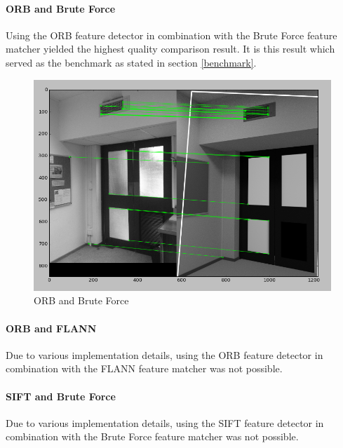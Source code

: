 \documentclass[11pt,a4paper]{report}
\begin{document}
				\paragraph{ORB and Brute Force}
					Using the ORB feature detector in combination with the Brute Force feature matcher yielded the highest quality comparison result. It is this result which served as the benchmark as stated in section \ref{benchmark}.
					\begin{figure}[H]
						\centering
						\includegraphics[width=1\textwidth]{best_comparason}
						\caption{ORB and Brute Force}
						\label{fig:orb_and_brute_force}
					\end{figure}
					
				\paragraph{ORB and FLANN}
					Due to various implementation details, using the ORB feature detector in combination with the FLANN feature matcher was not possible.
				
				\paragraph{SIFT and Brute Force}
					Due to various implementation details, using the SIFT feature detector in combination with the Brute Force feature matcher was not possible.
				
\end{document}
